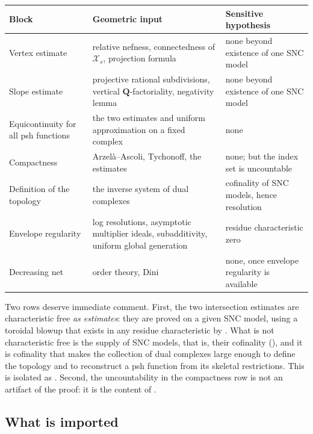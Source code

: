 \begin{center}
\small
\begin{tabular}{p{}p{}p{}}
\toprule
Block & Geometric input & Sensitive hypothesis\\
\midrule
Vertex estimate
 & relative nefness, connectedness of $\mathcal X_s$,
   projection formula
 & none beyond existence of one SNC model\\
Slope estimate
 & projective rational subdivisions, vertical
   $\mathbf Q$-factoriality, negativity lemma
 & none beyond existence of one SNC model\\
Equicontinuity for all psh functions
 & the two estimates and uniform approximation on a fixed complex
 & none\\
Compactness
 & Arzel\`a--Ascoli, Tychonoff, the estimates
 & none; but the index set is uncountable\\
Definition of the topology
 & the inverse system of dual complexes
 & cofinality of SNC models, hence resolution\\
Envelope regularity
 & log resolutions, asymptotic multiplier ideals, subadditivity,
   uniform global generation
 & residue characteristic zero\\
Decreasing net
 & order theory, Dini
 & none, once envelope regularity is available\\
\bottomrule
\end{tabular}
\end{center}

Two rows deserve immediate comment.  First, the two intersection estimates
are characteristic free \emph{as estimates}: they are proved on a given SNC
model, using a toroidal blowup that exists in any residue characteristic by
.  What is not characteristic free is the
supply of SNC models, that is, their cofinality
(), and it is cofinality that
makes the collection of dual complexes large enough to define the topology
and to reconstruct a psh function from its skeletal restrictions.  This is
isolated as .  Second, the
uncountability in the compactness row is not an artifact of the proof: it is
the content of .

\subsection{What is imported}
\label{sec:ch22-imports}

